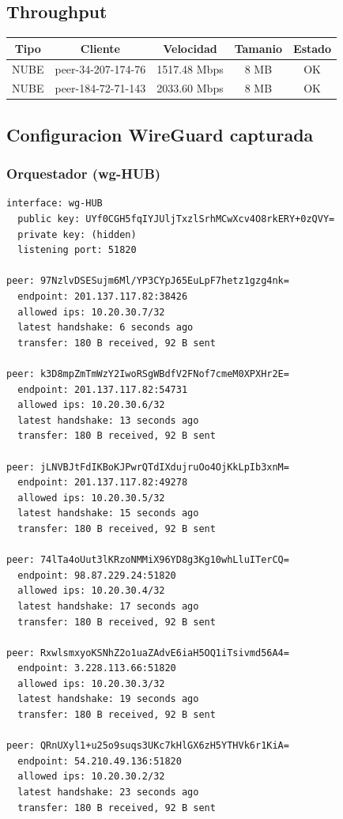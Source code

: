 \documentclass[11pt,a4paper]{article}
\begin{document}
\subsection{Throughput}
\begin{longtable}{|c|c|c|c|c|}
\hline
Tipo & Cliente & Velocidad & Tamanio & Estado \\ \hline
NUBE & peer-34-207-174-76 & 1517.48 Mbps & 8 MB & OK \\ \hline
NUBE & peer-184-72-71-143 & 2033.60 Mbps & 8 MB & OK \\ \hline
\end{longtable}

\subsection{Configuracion WireGuard capturada}
\subsubsection*{Orquestador (wg-HUB)}
\begin{lstlisting}
interface: wg-HUB
  public key: UYf0CGH5fqIYJUljTxzlSrhMCwXcv4O8rkERY+0zQVY=
  private key: (hidden)
  listening port: 51820

peer: 97NzlvDSESujm6Ml/YP3CYpJ65EuLpF7hetz1gzg4nk=
  endpoint: 201.137.117.82:38426
  allowed ips: 10.20.30.7/32
  latest handshake: 6 seconds ago
  transfer: 180 B received, 92 B sent

peer: k3D8mpZmTmWzY2IwoRSgWBdfV2FNof7cmeM0XPXHr2E=
  endpoint: 201.137.117.82:54731
  allowed ips: 10.20.30.6/32
  latest handshake: 13 seconds ago
  transfer: 180 B received, 92 B sent

peer: jLNVBJtFdIKBoKJPwrQTdIXdujruOo4OjKkLpIb3xnM=
  endpoint: 201.137.117.82:49278
  allowed ips: 10.20.30.5/32
  latest handshake: 15 seconds ago
  transfer: 180 B received, 92 B sent

peer: 74lTa4oUut3lKRzoNMMiX96YD8g3Kg10whLluITerCQ=
  endpoint: 98.87.229.24:51820
  allowed ips: 10.20.30.4/32
  latest handshake: 17 seconds ago
  transfer: 180 B received, 92 B sent

peer: RxwlsmxyoKSNhZ2o1uaZAdvE6iaH5OQ1iTsivmd56A4=
  endpoint: 3.228.113.66:51820
  allowed ips: 10.20.30.3/32
  latest handshake: 19 seconds ago
  transfer: 180 B received, 92 B sent

peer: QRnUXyl1+u25o9suqs3UKc7kHlGX6zH5YTHVk6r1KiA=
  endpoint: 54.210.49.136:51820
  allowed ips: 10.20.30.2/32
  latest handshake: 23 seconds ago
  transfer: 180 B received, 92 B sent

\end{lstlisting}
\end{document}
